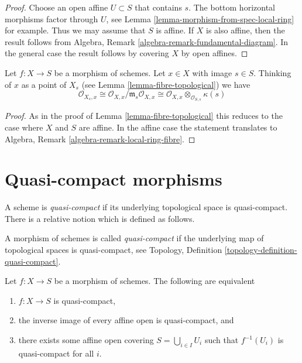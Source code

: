 \begin{proof}
Choose an open affine $U \subset S$ that contains $s$.
The bottom horizontal morphisms factor through $U$, see
Lemma \ref{lemma-morphism-from-spec-local-ring} for example.
Thus we may assume that $S$ is affine. If $X$ is also affine, then
the result follows from
Algebra, Remark \ref{algebra-remark-fundamental-diagram}.
In the general case the result follows by covering $X$ by open affines.
\end{proof}

\begin{lemma}
\label{lemma-local-ring-fibre}
Let $f : X \to S$ be a morphism of schemes. Let $x \in X$
with image $s \in S$. Thinking of $x$ as a point of $X_s$
(see Lemma \ref{lemma-fibre-topological}) we have
$$
\mathcal{O}_{X_s, x} \cong
\mathcal{O}_{X, x}/\mathfrak m_s\mathcal{O}_{X, x} \cong
\mathcal{O}_{X, x} \otimes_{\mathcal{O}_{S, s}} \kappa(s)
$$
\end{lemma}

\begin{proof}
As in the proof of Lemma \ref{lemma-fibre-topological} this reduces
to the case where $X$ and $S$ are affine. In the affine case the statement
translates to Algebra, Remark \ref{algebra-remark-local-ring-fibre}.
\end{proof}







\section{Quasi-compact morphisms}
\label{section-quasi-compact}

\noindent
A scheme is {\it quasi-compact} if its underlying topological space is
quasi-compact. There is a relative notion which is defined as follows.

\begin{definition}
\label{definition-quasi-compact}
A morphism of schemes is called {\it quasi-compact}
if the underlying map of topological spaces is
quasi-compact, see
Topology, Definition \ref{topology-definition-quasi-compact}.
\end{definition}

\begin{lemma}
\label{lemma-quasi-compact-affine}
Let $f : X \to S$ be a morphism of schemes.
The following are equivalent
\begin{enumerate}
\item $f : X \to S$ is quasi-compact,
\item the inverse image of every affine open is quasi-compact, and
\item there exists some affine open covering $S = \bigcup_{i \in I} U_i$
such that $f^{-1}(U_i)$ is quasi-compact for all $i$.
\end{enumerate}
\end{lemma}

